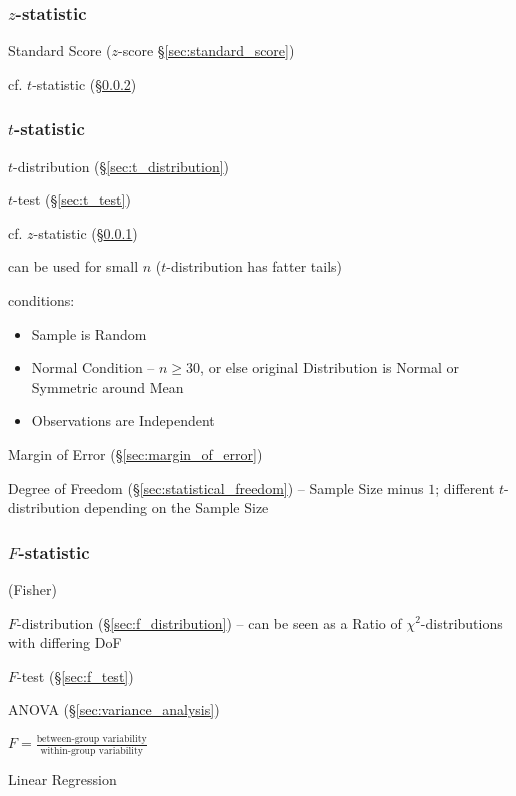 \subsubsection{$z$-statistic}\label{sec:z_statistic}

Standard Score ($z$-score \S\ref{sec:standard_score})

cf. $t$-statistic (\S\ref{sec:t_statistic})



\subsubsection{$t$-statistic}\label{sec:t_statistic}

$t$-distribution (\S\ref{sec:t_distribution})

$t$-test (\S\ref{sec:t_test})

cf. $z$-statistic (\S\ref{sec:z_statistic})

can be used for small $n$ ($t$-distribution has fatter tails)

conditions:
\begin{itemize}
  \item Sample is Random
  \item Normal Condition -- $n \geq 30$, or else original Distribution is Normal
    or Symmetric around Mean
  \item Observations are Independent
\end{itemize}

Margin of Error (\S\ref{sec:margin_of_error})

Degree of Freedom (\S\ref{sec:statistical_freedom}) -- Sample Size minus $1$;
different $t$-distribution depending on the Sample Size



\subsubsection{$F$-statistic}\label{sec:f_statistic}

(Fisher)

$F$-distribution (\S\ref{sec:f_distribution}) -- can be seen as a Ratio of
$\chi^2$-distributions with differing DoF

$F$-test (\S\ref{sec:f_test})

ANOVA (\S\ref{sec:variance_analysis})

$F = \frac{\text{between-group variability}}{\text{within-group variability}}$

Linear Regression



